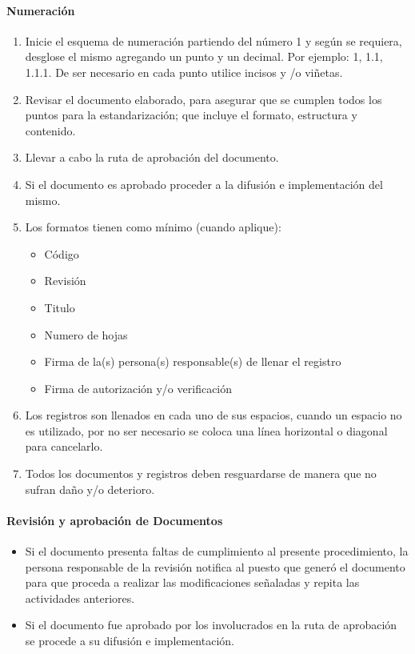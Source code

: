 \paragraph{Numeración}

\begin{enumerate}
	\item Inicie el esquema de numeración partiendo del número 1 y según se requiera, desglose el mismo agregando un punto y un decimal. Por ejemplo: 1, 1.1, 1.1.1. De ser necesario en cada punto utilice incisos y /o viñetas.
	\item Revisar el documento elaborado, para asegurar que se cumplen todos los puntos para la estandarización; que incluye el formato, estructura y contenido.
	\item Llevar a cabo la ruta de aprobación del documento.
	\item Si el documento es aprobado proceder a la difusión e implementación del mismo. 
	\item Los formatos tienen como mínimo (cuando aplique):
	\begin{itemize}
		\item Código
		\item Revisión
		\item Titulo
		\item Numero de hojas
		\item Firma de la(s) persona(s) responsable(s) de llenar el registro
		\item Firma de autorización y/o verificación
	\end{itemize}
	\item Los registros son llenados en cada uno de sus espacios, cuando un espacio no es utilizado, por no ser necesario se coloca una línea horizontal o diagonal para cancelarlo.
	\item Todos los documentos y registros deben resguardarse de manera que no sufran daño y/o deterioro.
\end{enumerate}

\paragraph{Revisión y aprobación de Documentos}

\begin{itemize}
	\item Si el documento presenta faltas de cumplimiento al presente procedimiento, la persona responsable de la revisión notifica al puesto que generó el documento para que proceda a realizar las modificaciones señaladas y repita las actividades anteriores.
	\item Si el documento fue aprobado por los involucrados en la ruta de aprobación se procede a su difusión e implementación.
\end{itemize}

